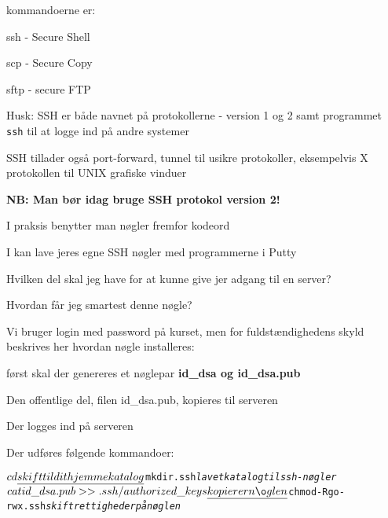 \documentclass[Screen16to9,17pt]{foils}
\begin{document}
\begin{list1}
\item kommandoerne er:
\begin{list2}
  \item ssh - Secure Shell
  \item scp - Secure Copy
  \item sftp - secure FTP
  \end{list2}
\item Husk: SSH er både navnet på protokollerne - version 1 og 2 samt
  programmet \verb+ssh+ til at logge ind på andre systemer
\item SSH tillader også port-forward, tunnel til usikre protokoller,
  eksempelvis X protokollen til UNIX grafiske vinduer
\item {\bfseries NB: Man bør idag bruge SSH protokol version 2!}
\end{list1}



I praksis benytter man nøgler fremfor kodeord
\begin{list1}
\item I kan lave jeres egne SSH nøgler med programmerne i Putty
\item Hvilken del skal jeg have for at kunne give jer adgang til en
  server?
\item Hvordan får jeg smartest denne nøgle?
\end{list1}

\begin{list1}
\item Vi bruger login med password på kurset, men for
  fuldstændighedens skyld beskrives her hvordan nøgle installeres:

\begin{list2}
\item først skal der genereres et nøglepar {\bfseries id\_dsa og id\_dsa.pub}
\item Den offentlige del, filen id\_dsa.pub, kopieres til serveren
\item Der logges ind på serveren
\item Der udføres følgende kommandoer:
\end{list2}
\end{list1}
\begin{alltt}
$ cd  \emph{skift til dit hjemmekatalog}
$ mkdir .ssh  \emph{lav et katalog til ssh-nøgler}
$ cat id\_dsa.pub >> .ssh/authorized\_keys  \emph{kopierer nøglen}
$ chmod -R go-rwx .ssh  \emph{skift rettigheder på nøglen}
\end{alltt}
\end{document}
